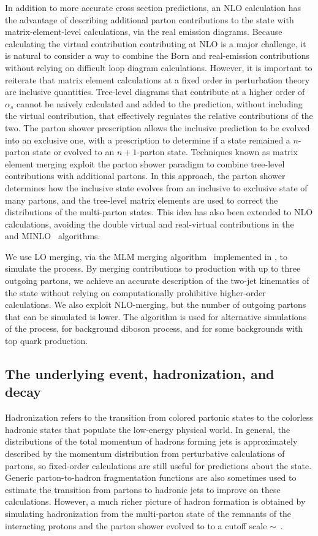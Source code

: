 In addition to more accurate cross section predictions,
an NLO calculation has the advantage of describing additional parton
contributions to the state with matrix-element-level calculations, via
the real emission diagrams. Because calculating the virtual contribution contributing at NLO
is a major challenge, it is natural to consider a way to combine the Born
and real-emission contributions without relying on difficult loop diagram calculations.
However, it is important to reiterate that matrix element calculations at a fixed
order in perturbation theory are inclusive quantities. 
Tree-level diagrams that contribute at a higher order of $\alpha_s$ cannot be naively
calculated and added to the prediction, without including the virtual contribution,
that effectively regulates the relative contributions of the two. 
The parton shower prescription allows the inclusive prediction to be evolved into 
an exclusive one, with a prescription to determine if a state remained a $n$-parton
state or evolved to an $n+1$-parton state. Techniques known as matrix element merging
exploit the parton shower paradigm to combine tree-level contributions with 
additional partons. In this approach, the parton shower determines how the
inclusive state evolves from an inclusive to exclusive state of many partons,
and the tree-level matrix elements are used to correct the distributions of the
multi-parton states.
This idea has also been extended to NLO calculations, avoiding the 
double virtual and real-virtual contributions in the \FxFx~\cite{Frederix:2012ps}
and MINLO~\cite{Hamilton:2012np} algorithms.

We use LO merging, via the MLM merging algorithm~\cite{MLMmerging} 
implemented in \MG, to simulate the \QCDWZ process. By merging
contributions to \WZ production with up to three outgoing partons, we achieve
an accurate description of the two-jet kinematics of the \WZjj state without
relying on computationally prohibitive higher-order calculations. 
We also exploit NLO-merging, 
but the number of outgoing partons that can be simulated is lower. 
The \FxFx algorithm is used for alternative simulations of the \QCDWZ
process, for background diboson process, and for some backgrounds with 
top quark production.

\subsection{The underlying event, hadronization, and decay}
Hadronization refers to the transition from colored partonic states to the 
colorless hadronic states that populate the low-energy physical world. 
In general, the distributions of the total momentum of hadrons forming jets is approximately
described by the momentum distribution from perturbative calculations of partons,
so fixed-order calculations are still useful for predictions about the \WZjj state.
Generic parton-to-hadron fragmentation functions
are also sometimes used to estimate the transition from partons to hadronic jets
to improve on these calculations.
However, a much richer picture of hadron formation 
is obtained by simulating hadronization from the
multi-parton state of the remnants of the interacting protons
and the parton shower evolved to to a cutoff scale
$\sim$\lqcd~\cite{Buckley:2011ms}. 

